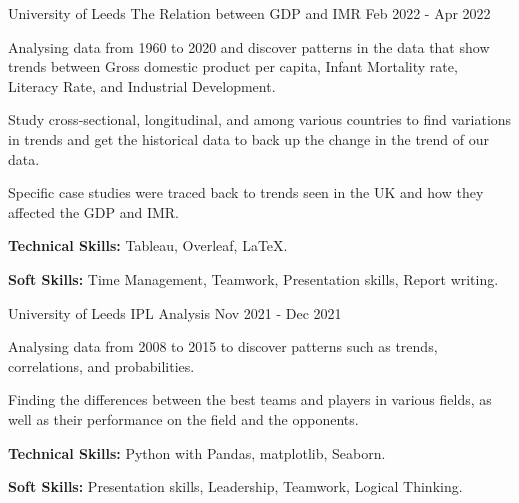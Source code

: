 

\begin{cventries}

  \cventry
    {University of Leeds} %
    {The Relation between GDP and IMR} %
    {} %
    {Feb 2022 - Apr 2022} %
    {
      \begin{cvitems} %
        \item {Analysing data from 1960 to 2020 and discover patterns in the data that show trends between Gross domestic product per capita, Infant Mortality rate, Literacy Rate, and Industrial Development.}
        \item {Study cross‑sectional, longitudinal, and among various countries to find variations in trends and get the historical data to back up the change in the trend of our data.}
        \item {Specific case studies were traced back to trends seen in the UK and how they affected the GDP and IMR.}
        \item {\textbf{Technical Skills:} Tableau, Overleaf, LaTeX.}
        \item {\textbf{Soft Skills:} Time Management, Teamwork, Presentation skills, Report writing.}
      \end{cvitems}
    }


  \cventry
    {University of Leeds} %
    {IPL Analysis} %
    {} %
    {Nov 2021 - Dec 2021} %
    {
      \begin{cvitems} %
        \item {Analysing data from 2008 to 2015 to discover patterns such as trends, correlations, and probabilities.}
        \item {Finding the differences between the best teams and players in various fields, as well as their performance on the field and the opponents.}
        \item {\textbf{Technical Skills:} Python with Pandas, matplotlib, Seaborn.}
        \item {\textbf{Soft Skills:} Presentation skills, Leadership, Teamwork, Logical Thinking.}
      \end{cvitems}
    }


\end{cventries}
